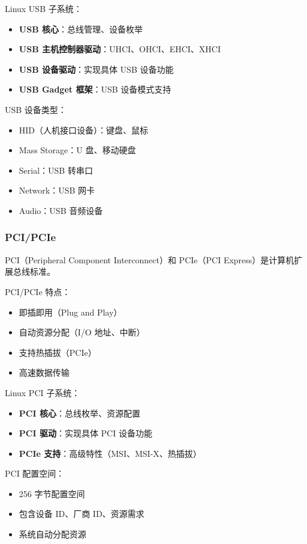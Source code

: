 Linux USB 子系统：
\begin{itemize}
  \item \textbf{USB 核心}：总线管理、设备枚举
  \item \textbf{USB 主机控制器驱动}：UHCI、OHCI、EHCI、XHCI
  \item \textbf{USB 设备驱动}：实现具体 USB 设备功能
  \item \textbf{USB Gadget 框架}：USB 设备模式支持
\end{itemize}

USB 设备类型：
\begin{itemize}
  \item HID（人机接口设备）：键盘、鼠标
  \item Mass Storage：U 盘、移动硬盘
  \item Serial：USB 转串口
  \item Network：USB 网卡
  \item Audio：USB 音频设备
\end{itemize}

\subsubsection{PCI/PCIe}

PCI（Peripheral Component Interconnect）和 PCIe（PCI Express）是计算机扩展总线标准。

PCI/PCIe 特点：
\begin{itemize}
  \item 即插即用（Plug and Play）
  \item 自动资源分配（I/O 地址、中断）
  \item 支持热插拔（PCIe）
  \item 高速数据传输
\end{itemize}

Linux PCI 子系统：
\begin{itemize}
  \item \textbf{PCI 核心}：总线枚举、资源配置
  \item \textbf{PCI 驱动}：实现具体 PCI 设备功能
  \item \textbf{PCIe 支持}：高级特性（MSI、MSI-X、热插拔）
\end{itemize}

PCI 配置空间：
\begin{itemize}
  \item 256 字节配置空间
  \item 包含设备 ID、厂商 ID、资源需求
  \item 系统自动分配资源
\end{itemize}

